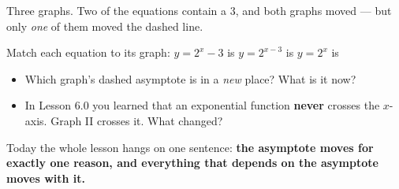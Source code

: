 \documentclass[10pt]{article}
\newcommand{\lgrid}[4]{%
  \draw[step=1, linegray!40, very thin] (#1,#3) grid (#2,#4);
  \draw[->, semithick, charcoal] (#1,0)--(#2,0) node[below right, font=\scriptsize]{$x$};
  \draw[->, semithick, charcoal] (0,#3)--(0,#4) node[left, font=\scriptsize]{$y$};}
\newcommand{\expgraph}[6]{\draw[very thick, forest, domain=#5:#6, samples=140, smooth]
  plot (\x,{(#1)*exp((#2)*((\x)-(#3)))+(#4)});}
\newcommand{\hasym}[3]{\draw[navy, dashed, semithick] (#1,#3)--(#2,#3);}
\begin{document}
\begin{hookbox}
Three graphs. Two of the equations contain a $3$, and both graphs moved --- but only \emph{one} of
them moved the dashed line.
\begin{center}
\end{center}
\vspace{2pt}
Match each equation to its graph: \quad $y=2^{x}-3$ \; is \blank{1.0cm} \quad
$y=2^{x-3}$ \; is \blank{1.0cm} \quad $y=2^{x}$ \; is \blank{1.0cm}
\begin{itemize}\setlength{\itemsep}{1pt}
  \item Which graph's dashed asymptote is in a \emph{new} place? What is it now? \writeline
  \item In Lesson 6.0 you learned that an exponential function \textbf{never} crosses the $x$-axis. Graph II crosses it. What changed? \writeline
\end{itemize}
Today the whole lesson hangs on one sentence: \textbf{the asymptote moves for exactly one reason, and
everything that depends on the asymptote moves with it.}
\end{hookbox}
\end{document}
